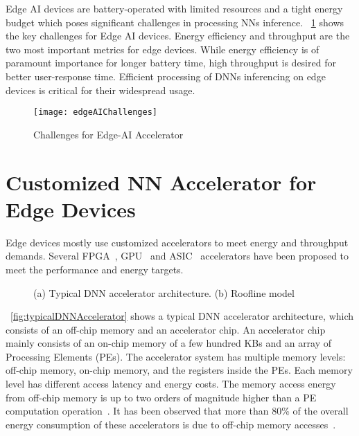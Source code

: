 Edge AI devices are battery-operated with limited resources and a tight energy budget which poses significant challenges in processing NNs inference. \figurename{~\ref{fig:edgeAIChallenges}} shows the key challenges for Edge AI devices. Energy efficiency and throughput are the two most important metrics for edge devices. While energy efficiency is of paramount importance for longer battery time, high throughput is desired for better user-response time. Efficient processing of DNNs inferencing on edge devices is critical for their widespread usage. 
\begin{figure}[!htb]
	\centering
	\captionsetup{font=sf}
	\texttt{[image: edgeAIChallenges]}
	\caption{Challenges for Edge-AI Accelerator}
	\label{fig:edgeAIChallenges}
\end{figure}
\section{Customized NN Accelerator for Edge Devices}
Edge devices mostly use customized accelerators to meet energy and throughput demands. Several FPGA~\cite{zhang2015optimizing,wei2019overcoming,gokhale2014240,8742284,gupta2015deep,alwani2016fused}, GPU~\cite{chetlur2014cudnn} and ASIC~\cite{Chen2016EyerissAS,chen2014diannao,chen2014dadiannao,du2015shidiannao} accelerators have been proposed to meet the performance and energy targets. 
\begin{figure}[!htb]
	\centering
	\captionsetup{font=sf}
	\hfil
	\caption{(a) Typical DNN accelerator architecture. (b) Roofline model}
	\label{fig:acceleratorAndRoofline}
\end{figure}
\figurename{~\ref{fig:typicalDNNAccelerator}} shows a typical DNN accelerator architecture, which consists of an off-chip memory and an accelerator chip. An accelerator chip mainly consists of an on-chip memory of a few hundred KBs and an array of Processing Elements (PEs). The accelerator system has multiple memory levels: off-chip memory, on-chip memory, and the registers inside the PEs. Each memory level has different access latency and energy costs. The memory access energy from off-chip memory is up to two orders of magnitude higher than a PE computation operation~\cite{Chen2016EyerissAS}. It has been observed that more than 80\% of the overall energy consumption of these accelerators is due to off-chip memory accesses~\cite{chen2014diannao}. 

